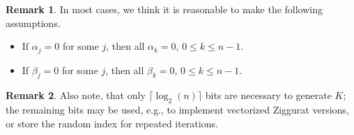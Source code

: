 \documentclass{article}
\renewcommand{\leq}{\leqslant}
\theoremstyle{definition} %
\newtheorem{remark}{Remark}
\newcommand{\ceil}[1]{\lceil{#1}\rceil}
\begin{document}
\begin{remark}
    In most cases, we think it is reasonable to make the following assumptions.
    \begin{itemize}
        \item If $\alpha _j = 0$ for some $j$, then all $\alpha _k = 0$, $0 \leq k \leq n - 1$.
        \item If $\beta _j = 0$ for some $j$, then all $\beta _k = 0$, $0 \leq k \leq n - 1$.
    \end{itemize}
\end{remark}

\begin{remark}
    Also note, that only $\ceil{\log _2 (n)}$ bits are necessary to generate $K$; the remaining bits may be used, e.g., to implement vectorized Ziggurat versions, or store the random index for repeated iterations.
\end{remark}



\end{document}
